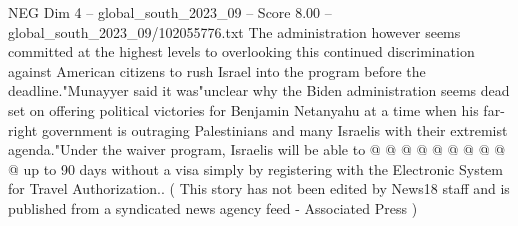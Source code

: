 \begin{textsample}{NEG Dim 4 – global\_south\_2023\_09 – Score 8.00 – global\_south\_2023\_09/102055776.txt}
The administration however seems committed at the highest levels to overlooking this continued discrimination against American citizens to rush Israel into the program before the deadline."Munayyer said it was"unclear why the Biden administration seems dead set on offering political victories for Benjamin Netanyahu at a time when his far-right government is outraging Palestinians and many Israelis with their extremist agenda."Under the waiver program, Israelis will be able to @ @ @ @ @ @ @ @ @ @ up to 90 days without a visa simply by registering with the Electronic System for Travel Authorization.. ( This story has not been edited by News18 staff and is published from a syndicated news agency feed - Associated Press )

\end{textsample}
